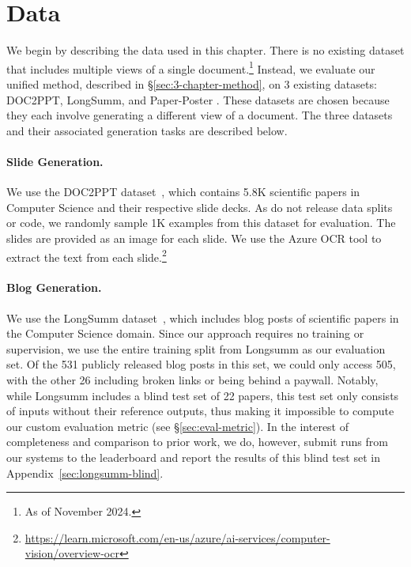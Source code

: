 \section{Data}\label{sec:data}

We begin by describing the data used in this chapter. There is no existing dataset that includes multiple views of a single document.\footnote{As of November 2024.} Instead, we evaluate our unified method, described in \S\ref{sec:3-chapter-method}, on 3 existing datasets: DOC2PPT, LongSumm, and Paper-Poster \cite{Fu2021DOC2PPTAP,chandrasekaran2020overview,Qiang2016LearningTG}. These datasets are chosen because they each involve generating a different view of a document. The three datasets and their associated generation tasks are described below.

\paragraph{Slide Generation.} We use the DOC2PPT dataset~\cite{Fu2021DOC2PPTAP}, which contains 5.8K scientific papers in Computer Science and their respective slide decks. As \textcite{Fu2021DOC2PPTAP} do not release data splits or code, we randomly sample 1K examples from this dataset for evaluation. The slides are provided as an image for each slide. We use the Azure OCR tool to extract the text from each slide.\footnote{\scriptsize \url{https://learn.microsoft.com/en-us/azure/ai-services/computer-vision/overview-ocr}}

\paragraph{Blog Generation.} We use the LongSumm dataset~\cite{chandrasekaran2020overview}, which includes blog posts of scientific papers in the Computer Science domain. Since our approach requires no training or supervision, we use the entire training split from Longsumm as our evaluation set. Of the 531 publicly released blog posts in this set, we could only access 505, with the other 26 including broken links or being behind a paywall. Notably, while Longsumm includes a blind test set of 22 papers, this test set only consists of inputs without their reference outputs, thus making it impossible to compute our custom evaluation metric (see \S\ref{sec:eval-metric}). In the interest of completeness and comparison to prior work, we do, however, submit runs from our systems to the leaderboard and report the results of this blind test set in Appendix~\ref{sec:longsumm-blind}.

